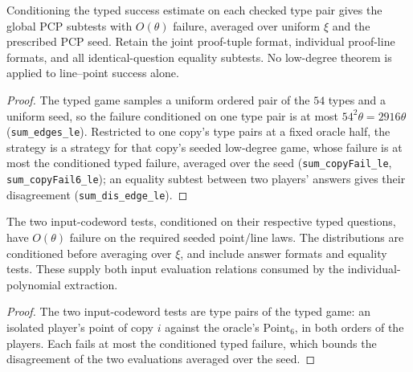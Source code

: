 \begin{lemma}
\label{lem:ar-global-tests}
\leanok
Conditioning the typed success estimate on each checked type pair gives the
global PCP subtests with $O(\theta)$ failure, averaged over uniform $\xi$
and the prescribed PCP seed. Retain the joint proof-tuple format, individual
proof-line formats, and all identical-question equality subtests. No
low-degree theorem is applied to line--point success alone.
\end{lemma}

\begin{proof}
\leanok
The typed game samples a uniform ordered pair of the $54$ types and a uniform seed, so the
failure conditioned on one type pair is at most $54^2\theta=2916\theta$
(\texttt{sum\_edges\_le}). Restricted to one copy's type pairs at a fixed oracle half, the
strategy is a strategy for that copy's seeded low-degree game, whose failure is at most the
conditioned typed failure, averaged over the seed (\texttt{sum\_copyFail\_le},
\texttt{sum\_copyFail6\_le}); an equality subtest between two players' answers gives their
disagreement (\texttt{sum\_dis\_edge\_le}).
\end{proof}

\begin{lemma}
\label{lem:ar-input-tests}
\leanok
The two input-codeword tests, conditioned on their respective typed questions,
have $O(\theta)$ failure on the required seeded point/line laws. The
distributions are conditioned before averaging over $\xi$, and include
answer formats and equality tests. These supply both input evaluation
relations consumed by the individual-polynomial extraction.
\end{lemma}

\begin{proof}
\leanok
The two input-codeword tests are type pairs of the typed game: an isolated player's point of
copy $i$ against the oracle's $\mathrm{Point}_6$, in both orders of the players. Each fails at
most the conditioned typed failure, which bounds the disagreement of the two evaluations
averaged over the seed.
\end{proof}

